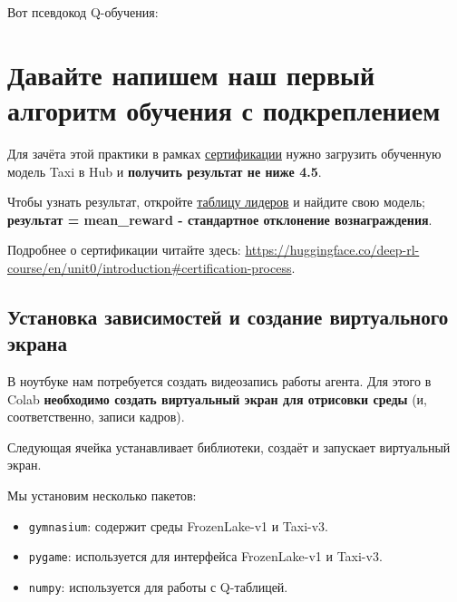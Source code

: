 \documentclass[11pt,a4paper]{article}
\begin{document}

Вот псевдокод Q-обучения:


\section{Давайте напишем наш первый алгоритм обучения с подкреплением}\label{lets-code-our-first-reinforcement-learning-algorithm}

Для зачёта этой практики в рамках \href{https://huggingface.co/deep-rl-course/en/unit0/introduction\#certification-process}{сертификации} нужно загрузить обученную модель Taxi в Hub и \textbf{получить результат не ниже 4.5}.

Чтобы узнать результат, откройте \href{https://huggingface.co/spaces/huggingface-projects/Deep-Reinforcement-Learning-Leaderboard}{таблицу лидеров} и найдите свою модель; \textbf{результат = mean\_reward - стандартное отклонение вознаграждения}.

Подробнее о сертификации читайте здесь: \url{https://huggingface.co/deep-rl-course/en/unit0/introduction\#certification-process}.

\subsection{Установка зависимостей и создание виртуального экрана}\label{install-dependencies-and-create-a-virtual-display}

В ноутбуке нам потребуется создать видеозапись работы агента. Для этого в Colab \textbf{необходимо создать виртуальный экран для отрисовки среды} (и, соответственно, записи кадров).

Следующая ячейка устанавливает библиотеки, создаёт и запускает виртуальный экран.

Мы установим несколько пакетов:

\begin{itemize}
\tightlist
\item
  \passthrough{\lstinline!gymnasium!}: содержит среды FrozenLake-v1 и Taxi-v3.
\item
  \passthrough{\lstinline!pygame!}: используется для интерфейса FrozenLake-v1 и Taxi-v3.
\item
  \passthrough{\lstinline!numpy!}: используется для работы с Q-таблицей.
\end{itemize}
\end{document}

